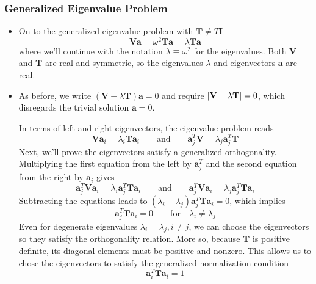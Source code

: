 \documentclass[11pt, a4paper]{article}
\newcommand{\eqtext}[1]{\qquad \text{#1} \qquad}
\newcommand{\mat}[1]{\mathbf{#1}}
\begin{document}
\subsubsection{Generalized Eigenvalue Problem}
\begin{itemize}
	\item On to the generalized eigenvalue problem with $ \mat{T} \neq T \mat{I} $
	\begin{equation*}
		\mat{V}\bm{a} = \omega^{2} \mat{T} \bm{a} = \lambda \mat{T} \bm{a}
	\end{equation*}
	where we'll continue with the notation $ \lambda \equiv \omega^{2} $ for the eigenvalues. Both $ \mat{V} $ and $ \mat{T} $ are real and symmetric, so the eigenvalues $ \lambda $ and eigenvectors $ \bm{a} $ are real. 
	
	\item As before, we write $ (\mat{V} - \lambda \mat{T}) \bm{a} = 0$ and require $ \abs{\mat{V} - \lambda \mat{T}} = 0 $, which disregards the trivial solution $ \bm{a} = 0$. 
	
	In terms of left and right eigenvectors, the eigenvalue problem reads
	\begin{equation*}
		\mat{V}\bm{a}_{i} = \lambda_{i} \mat{T} \bm{a}_{i} \eqtext{and} \mat{a}_{j}^{T}  \mat{V} = \lambda_{j} \mat{a}_{j}^{T} \mat{T} 
	\end{equation*}
	Next, we'll prove the eigenvectors satisfy a generalized orthogonality. Multiplying the first equation from the left by $ \bm{a}_{j}^{T} $ and the second equation from the right by $ \bm{a}_{i} $ gives
	\begin{equation*}
		\mat{a}_{j}^{T} \mat{V}\bm{a}_{i} = \lambda_{i} \mat{a}_{j}^{T}  \mat{T} \bm{a}_{i} \eqtext{and} \mat{a}_{j}^{T}  \mat{V}\bm{a}_{i} = \lambda_{j} \mat{a}_{j}^{T} \mat{T} \bm{a}_{i}
	\end{equation*}
	Subtracting the equations leads to $ (\lambda_{i} - \lambda_{j}) \mat{a}_{j}^{T} \mat{T} \bm{a}_{i} = 0 $, which implies 
	\begin{equation*}
		\mat{a}_{j}^{T} \mat{T} \bm{a}_{i} = 0  \qquad \text{for} \quad \lambda_{i} \neq \lambda_{j}
	\end{equation*}
	Even for degenerate eigenvalues $ \lambda_{i} = \lambda_{j}, i \neq j $, we can choose the eigenvectors so they satisfy the orthogonality relation.  More so, because $ \mat{T} $ is positive definite, its diagonal elements must be positive and nonzero. This allows us to chose the eigenvectors to satisfy the generalized normalization condition
	\begin{equation*}
		\bm{a}_{i}^{T} \mat{T} \bm{a}_{i} = 1
	\end{equation*}
	

\end{itemize}
\end{document}

